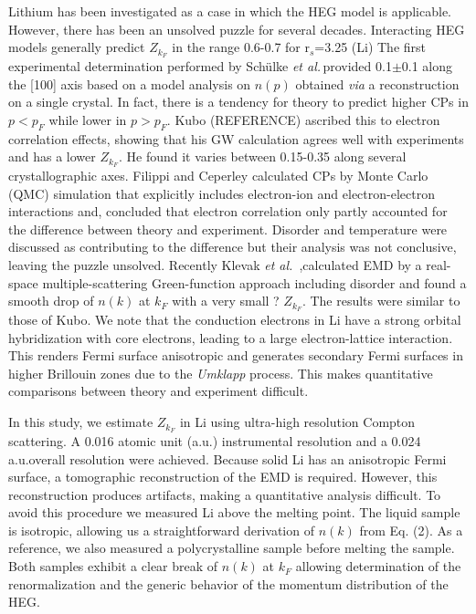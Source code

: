 \documentclass[twocolumn,showpacs,showkeys,fleqn,prl,superscriptaddress]{revtex4}%
\newcommand{\ii}[1]{\textit{#1}}
\begin{document}
Lithium has  been investigated as a case in which the HEG model is applicable.
However, there has been an unsolved puzzle for several decades. 
Interacting HEG models generally predict $Z_{k_F}$ in the range 0.6-0.7 for r$_s$=3.25 (Li)
The first experimental determination performed by Sch{\"u}lke \ii{et al.}\,provided 0.1$\pm$0.1 along the [100] axis based on a model analysis on $n(p)$ obtained \ii{via} a reconstruction on a single crystal\cite{schulke96}. 
In fact, there is a tendency %
for theory to predict higher CPs in $p<p_F$ while lower in $p>p_F$\cite{saku95}. 
Kubo (REFERENCE) ascribed this to electron correlation effects, showing that his GW calculation agrees well with experiments and has a lower $Z_{k_F}$. He found it varies between 0.15-0.35 along several crystallographic axes\cite{kubo95,kubo97}.
Filippi and Ceperley calculated CPs by Monte Carlo (QMC) simulation that explicitly includes electron-ion and electron-electron interactions and, concluded that electron correlation  only partly accounted for the difference between theory and experiment\cite{filippi99}.  
Disorder \cite{dugdale98} and temperature\cite{stern01} were discussed as contributing to the difference but their analysis was not conclusive, leaving the puzzle unsolved.
Recently Klevak \ii{et al.}\ \cite{klevak16},calculated EMD by a real-space multiple-scattering Green-function approach including disorder and found a smooth drop of $n(k)$ at $k_F$ with a very small ? $Z_{k_F}$. The results were similar to those of  Kubo.  
We note that the conduction electrons in Li have a strong orbital hybridization with core electrons, leading to a large electron-lattice interaction.
This renders Fermi surface anisotropic and generates secondary Fermi surfaces in higher Brillouin zones due to the {\it{Umklapp}} process.
This makes quantitative comparisons between theory and experiment difficult. 

In this study, we estimate $Z_{k_F}$ in Li using ultra-high resolution Compton scattering. A 0.016 atomic unit (a.u.) instrumental resolution and a 0.024 a.u.\;overall resolution were achieved.
Because solid Li has an anisotropic Fermi surface, a tomographic reconstruction of the EMD is required. However, this reconstruction produces artifacts, making a quantitative analysis difficult.
To avoid this procedure we measured Li above the melting point.
The liquid sample is isotropic, allowing us a straightforward derivation of $n(k)$ from Eq. (2).
As a reference, we also measured a polycrystalline sample before melting the sample.
Both samples exhibit a clear break of $n(k)$ at $k_F$ allowing determination of the renormalization and the generic behavior of the momentum distribution of the HEG\cite{holz11}.
\end{document}
